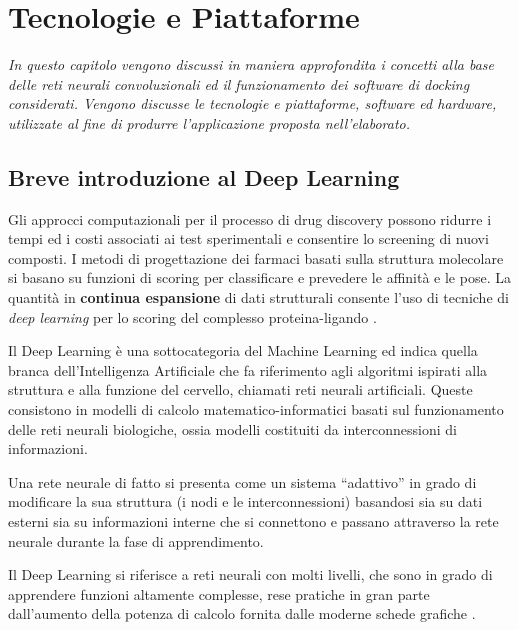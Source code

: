\chapter{Tecnologie e Piattaforme}

\vskip 1cm
\textit{In questo capitolo vengono discussi in maniera approfondita i concetti alla base delle reti neurali convoluzionali ed il funzionamento dei software di docking considerati. Vengono discusse le tecnologie e piattaforme, software ed hardware, utilizzate al fine di produrre l'applicazione proposta nell'elaborato. }

\vskip 1cm
\section{Breve introduzione al Deep Learning}
Gli approcci computazionali per il processo di drug discovery possono ridurre i tempi ed i costi associati ai test sperimentali e consentire lo screening di nuovi composti. I metodi di progettazione dei farmaci basati sulla struttura molecolare si basano su funzioni di scoring per classificare e prevedere le affinità e le pose. 
La quantità in \textbf{continua espansione} di dati strutturali consente l'uso di tecniche di \textit{deep learning} per lo scoring del complesso proteina-ligando \cite{ragoza_protein-ligand_2017}.

Il Deep Learning è una sottocategoria del Machine Learning ed indica quella branca dell’Intelligenza Artificiale che fa riferimento agli algoritmi ispirati alla struttura e alla funzione del cervello, chiamati reti neurali artificiali. Queste consistono in modelli di calcolo matematico-informatici basati sul funzionamento delle reti neurali biologiche, ossia modelli costituiti da interconnessioni di informazioni. 

Una rete neurale di fatto si presenta come un sistema “adattivo” in grado di modificare la sua struttura (i nodi e le interconnessioni) basandosi sia su dati esterni sia su informazioni interne che si connettono e passano attraverso la rete neurale durante la fase di apprendimento.

Il Deep Learning si riferisce a reti neurali con molti livelli, che sono in grado di apprendere funzioni altamente complesse, rese pratiche in gran parte dall'aumento della potenza di calcolo fornita dalle moderne schede grafiche \cite{ragoza_protein-ligand_2017}.


